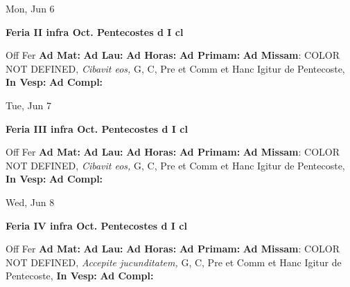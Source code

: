 \documentclass[10pt]{book}
\begin{document}
\begin{center}
\begin{minipage}{3.5in}
\vspace{2em}
\begin{center}Mon, Jun 6
\end{center}
\textbf{ \large Feria II infra Oct. Pentecostes
\textnormal{\normalsize d I cl}}

\begin{justify}Off Fer
\textbf{Ad Mat: }
\textbf{Ad Lau: }
\textbf{Ad Horas: }
\textbf{Ad Primam: }\textbf{Ad Missam}: COLOR NOT DEFINED, \textit{Cibavit eos,} G, C, Pre et Comm et Hanc Igitur de Pentecoste, 
\textbf{In Vesp: }
\textbf{Ad Compl: }
\end{justify}
\end{minipage}
\end{center}

\begin{center}
\begin{minipage}{3.5in}
\vspace{2em}
\begin{center}Tue, Jun 7
\end{center}
\textbf{ \large Feria III infra Oct. Pentecostes
\textnormal{\normalsize d I cl}}

\begin{justify}Off Fer
\textbf{Ad Mat: }
\textbf{Ad Lau: }
\textbf{Ad Horas: }
\textbf{Ad Primam: }\textbf{Ad Missam}: COLOR NOT DEFINED, \textit{Cibavit eos,} G, C, Pre et Comm et Hanc Igitur de Pentecoste, 
\textbf{In Vesp: }
\textbf{Ad Compl: }
\end{justify}
\end{minipage}
\end{center}

\begin{center}
\begin{minipage}{3.5in}
\vspace{2em}
\begin{center}Wed, Jun 8
\end{center}
\textbf{ \large Feria IV infra Oct. Pentecostes
\textnormal{\normalsize d I cl}}

\begin{justify}Off Fer
\textbf{Ad Mat: }
\textbf{Ad Lau: }
\textbf{Ad Horas: }
\textbf{Ad Primam: }\textbf{Ad Missam}: COLOR NOT DEFINED, \textit{Accepite jucunditatem,} G, C, Pre et Comm et Hanc Igitur de Pentecoste, 
\textbf{In Vesp: }
\textbf{Ad Compl: }
\end{justify}
\end{minipage}
\end{center}
\end{document}
